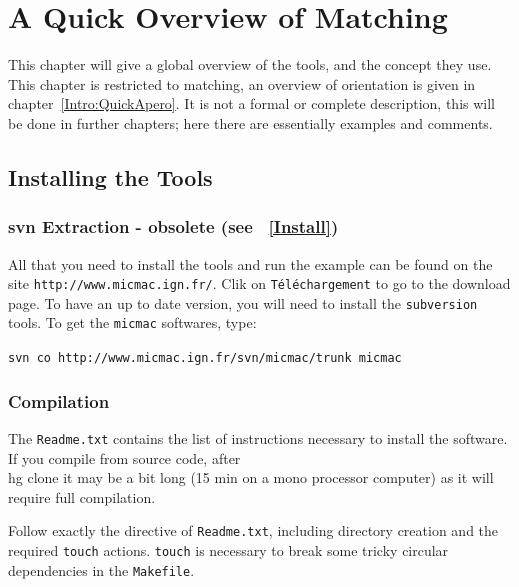 \chapter{A Quick Overview of Matching}

This chapter will give a global overview of the tools, and the
concept they use.  This chapter is restricted to matching,
an overview of orientation is given in chapter~\ref{Intro:QuickApero}.
It is not a formal or complete description,  this
will be done in further chapters; here there are essentially examples
and comments.

\label{Intro:QuickR}


\section{Installing the Tools}


\subsection{svn Extraction - obsolete (see ~\ref{Install})}

All that you need to install the tools and run the example can be found on the site
{\tt http://www.micmac.ign.fr/}. Clik on {\tt T\'el\'echargement} to go to the
download page. To have an up to date version, you will need to install
the {\tt subversion} tools.  To get the {\tt micmac}  softwares, type:

{\tt svn co http://www.micmac.ign.fr/svn/micmac/trunk micmac }

\subsection{Compilation}

The {\tt Readme.txt} contains the list of instructions necessary to install
the software. If you compile from source code, after { \\ hg clone } it may be a bit long (15 min
on a mono processor computer) as it will require full compilation.

Follow exactly the directive of {\tt Readme.txt}, including directory creation
and the required {\tt touch} actions. {\tt touch}  is necessary  to
break some tricky circular dependencies in the {\tt Makefile}.


